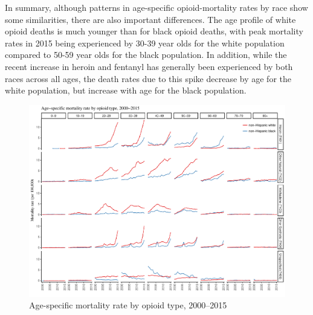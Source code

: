 \documentclass[12pt, a4paper]{article}
\begin{document}
In summary, although patterns in age-specific opioid-mortality rates by race show some similarities, there are also important differences. The age profile of white opioid deaths is much younger than for black opioid deaths, with peak mortality rates in 2015 being experienced by 30-39 year olds for the white population compared to 50-59 year olds for the black population. In addition, while the recent increase in heroin and fentanyl has generally been experienced by both races across all ages, the death rates due to this spike decrease by age for the white population, but increase with age for the black population. 
%

\begin{figure}[h!]
 \centering
\includegraphics[width=1\textwidth]{./plots/paper_fig7_t40_notpretty.pdf} 
 \caption{Age-specific mortality rate by opioid type, 2000--2015}
 \label{fig:tcode_race}
\end{figure}
\end{document}
